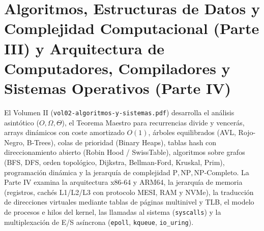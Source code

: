 \documentclass{book}
\begin{document}
\section{Algoritmos, Estructuras de Datos y Complejidad Computacional (Parte III) y Arquitectura de Computadores, Compiladores y Sistemas Operativos (Parte IV)}

El Volumen II (\texttt{vol02-algoritmos-y-sistemas.pdf}) desarrolla el análisis asintótico (\(O, \Omega, \Theta\)), el Teorema Maestro para recurrencias divide y vencerás, arrays dinámicos con coste amortizado \(O(1)\), árboles equilibrados (AVL, Rojo-Negro, B-Trees), colas de prioridad (Binary Heaps), tablas hash con direccionamiento abierto (Robin Hood / SwissTable), algoritmos sobre grafos (BFS, DFS, orden topológico, Dijkstra, Bellman-Ford, Kruskal, Prim), programación dinámica y la jerarquía de complejidad \(\text{P}, \text{NP}, \text{NP-Completo}\).
La Parte IV examina la arquitectura x86-64 y ARM64, la jerarquía de memoria (registros, cachés L1/L2/L3 con protocolo MESI, RAM y NVMe), la traducción de direcciones virtuales mediante tablas de páginas multinivel y TLB, el modelo de procesos e hilos del kernel, las llamadas al sistema (\texttt{syscalls}) y la multiplexación de E/S asíncrona (\texttt{epoll}, \texttt{kqueue}, \texttt{io\_uring}).
\end{document}
